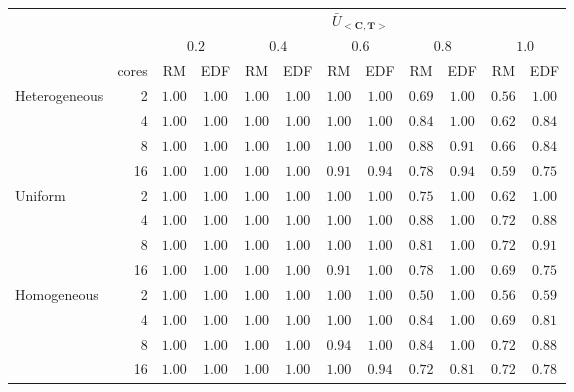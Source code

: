 \begin{tabular}{l r c c c c c c c c c c}
\toprule
 & & \multicolumn{10}{c}{ $\bar{U}_{<\mathbf{C}, \mathbf{T}>}$}\\
 & & \multicolumn{2}{c}{$0.2$} & \multicolumn{2}{c}{$0.4$} & \multicolumn{2}{c}{$0.6$} & \multicolumn{2}{c}{$0.8$} & \multicolumn{2}{c}{$1.0$}\\
\cmidrule(lr){3-4} \cmidrule(lr){5-6} \cmidrule(lr){7-8}  \cmidrule(lr){9-10} \cmidrule(lr){11-12} 
 & cores & RM & EDF & RM & EDF & RM & EDF & RM & EDF & RM & EDF \\
\cmidrule(lr){3-3} \cmidrule(lr){4-4} \cmidrule(lr){5-5} \cmidrule(lr){6-6} \cmidrule(lr){7-7} \cmidrule(lr){8-8} \cmidrule(lr){9-9} \cmidrule(lr){10-10} \cmidrule(lr){11-11} \cmidrule(lr){12-12}


\multirow{4}{*}{Heterogeneous} & 2 & $1.00$ & $1.00$ & $1.00$ & $1.00$ & $1.00$ & $1.00$ & $0.69$ & $1.00$ & $0.56$ & $1.00$\\ 
 & 4 & $1.00$ & $1.00$ & $1.00$ & $1.00$ & $1.00$ & $1.00$ & $0.84$ & $1.00$ & $0.62$ & $0.84$\\ 
 & 8 & $1.00$ & $1.00$ & $1.00$ & $1.00$ & $1.00$ & $1.00$ & $0.88$ & $0.91$ & $0.66$ & $0.84$\\ 
 & 16 & $1.00$ & $1.00$ & $1.00$ & $1.00$ & $0.91$ & $0.94$ & $0.78$ & $0.94$ & $0.59$ & $0.75$\\ 
\cmidrule(lr){1-2}
\multirow{4}{*}{Uniform} & 2 & $1.00$ & $1.00$ & $1.00$ & $1.00$ & $1.00$ & $1.00$ & $0.75$ & $1.00$ & $0.62$ & $1.00$\\ 
 & 4 & $1.00$ & $1.00$ & $1.00$ & $1.00$ & $1.00$ & $1.00$ & $0.88$ & $1.00$ & $0.72$ & $0.88$\\ 
 & 8 & $1.00$ & $1.00$ & $1.00$ & $1.00$ & $1.00$ & $1.00$ & $0.81$ & $1.00$ & $0.72$ & $0.91$\\ 
 & 16 & $1.00$ & $1.00$ & $1.00$ & $1.00$ & $0.91$ & $1.00$ & $0.78$ & $1.00$ & $0.69$ & $0.75$\\ 
\cmidrule(lr){1-2}
\multirow{4}{*}{Homogeneous} & 2 & $1.00$ & $1.00$ & $1.00$ & $1.00$ & $1.00$ & $1.00$ & $0.50$ & $1.00$ & $0.56$ & $0.59$\\ 
 & 4 & $1.00$ & $1.00$ & $1.00$ & $1.00$ & $1.00$ & $1.00$ & $0.84$ & $1.00$ & $0.69$ & $0.81$\\ 
 & 8 & $1.00$ & $1.00$ & $1.00$ & $1.00$ & $0.94$ & $1.00$ & $0.84$ & $1.00$ & $0.72$ & $0.88$\\ 
 & 16 & $1.00$ & $1.00$ & $1.00$ & $1.00$ & $1.00$ & $0.94$ & $0.72$ & $0.81$ & $0.72$ & $0.78$\\


\bottomrule
\end{tabular}